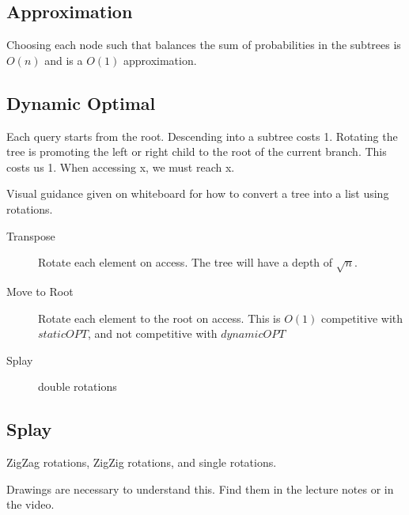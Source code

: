 \documentclass[a4paper]{article}
\begin{document}
\subsection{Approximation}
Choosing each node such that balances the sum of probabilities in the subtrees is $O(n)$ and is a $O(1)$ approximation.

\subsection{Dynamic Optimal}
Each query starts from the root.
Descending into a subtree costs 1.
Rotating the tree is promoting the left or right child to the root of the current branch. This costs us 1.
When accessing x, we must reach x.

Visual guidance given on whiteboard for how to convert a tree into a list using rotations.

\begin{description}
  \item[Transpose] Rotate each element on access. The tree will have a depth of $\sqrt{n}$.
  \item[Move to Root] Rotate each element to the root on access. This is $O(1)$ competitive with $staticOPT$, and not competitive with $dynamicOPT$
  \item[Splay] double rotations
\end{description}

\subsection{Splay}

ZigZag rotations, ZigZig rotations, and single rotations.

Drawings are necessary to understand this. Find them in the lecture notes or in the video.
\end{document}

